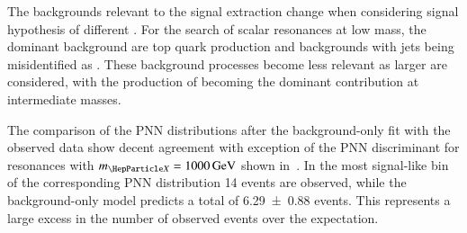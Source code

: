 \begin{table}[htbp]
  \centering

  \caption{Expected number of events per physics process in the
    \hadhad signal region for signal-like bins of the PNN discriminant
    after the background-only fit to observed data in all regions. The
    two most signal-like bins are shown for $\mX = \SI{300}{\GeV}$ and
    \SI{500}{\GeV}. $\dagger$: The large discrimination power of the
    PNN for large \mX leads to a small number of bins for the
    statistical interpretation due to the choice of re-binning
    algorithm. Therefore, the expected number of events is shown only
    for the most signal-like bin for $\mX = \SI{1000}{\GeV}$ and
    \SI{1600}{\GeV}.}%
  \label{tab:yields_postfit_resonant}

  \resizebox{\textwidth}{!}{%
    
  }
\end{table}

The backgrounds relevant to the signal extraction change when
considering signal hypothesis of different \mX. For the search of
scalar resonances at low mass, the dominant background are top quark
production and backgrounds with jets being misidentified as
\tauhadvis. These background processes become less relevant as larger
\mX are considered, with the production of \Zjets becoming the
dominant contribution at intermediate masses.

The comparison of the PNN distributions after the background-only fit
with the observed data show decent agreement with exception of the PNN
discriminant for resonances with $\mX = \SI{1000}{\GeV}$ shown
in~. In the most signal-like bin of the
corresponding PNN distribution 14 events are observed, while the
background-only model predicts a total of \num{6.29 +- 0.88}
events. This represents a large excess in the number of observed
events over the expectation.

